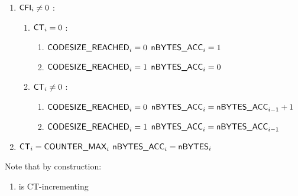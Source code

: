 \begin{enumerate}
	\item \If $\textsf{CFI}_{i} \neq 0$ \Then:
	\begin{enumerate}
		\item \If $\textsf{CT}_{i}=0$ \Then:
		\begin{enumerate}
		 	\item \If $\textsf{CODESIZE\_REACHED}_{i}=0$ \Then $\textsf{nBYTES\_ACC}_{i}=1$
		 	\item \If $\textsf{CODESIZE\_REACHED}_{i}=1$ \Then $\textsf{nBYTES\_ACC}_{i}=0$ 
		\end{enumerate}
		\item \If $\textsf{CT}_{i} \neq 0$ \Then:
		\begin{enumerate}
		 	\item \If $\textsf{CODESIZE\_REACHED}_{i}=0$ \Then $\textsf{nBYTES\_ACC}_{i}=\textsf{nBYTES\_ACC}_{i-1}+1$
		 	\item \If $\textsf{CODESIZE\_REACHED}_{i}=1$ \Then $\textsf{nBYTES\_ACC}_{i}=\textsf{nBYTES\_ACC}_{i-1}$ 
		\end{enumerate} 
	\end{enumerate}
	\item \If $\textsf{CT}_{i}=\textsf{COUNTER\_MAX}_{i}$ \Then $\textsf{nBYTES\_ACC}_{i}=\textsf{nBYTES}_{i}$
\end{enumerate}

Note that by construction:
\begin{enumerate}[resume]
	\item \nBytesAcc{} is CT-incrementing \quad \trash 
\end{enumerate}
